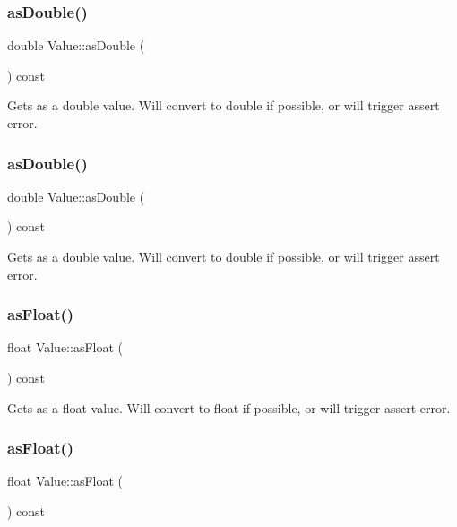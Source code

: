\subsubsection{\texorpdfstring{as\+Double()}{asDouble()}\hspace{0.1cm}{\footnotesize\ttfamily [1/2]}}
{\footnotesize\ttfamily double Value\+::as\+Double (\begin{DoxyParamCaption}{ }\end{DoxyParamCaption}) const}

Gets as a double value. Will convert to double if possible, or will trigger assert error. \mbox{\label{classValue_abf6f3457cc800530c5a60bf2990ab6a7}} 
\subsubsection{\texorpdfstring{as\+Double()}{asDouble()}\hspace{0.1cm}{\footnotesize\ttfamily [2/2]}}
{\footnotesize\ttfamily double Value\+::as\+Double (\begin{DoxyParamCaption}{ }\end{DoxyParamCaption}) const}

Gets as a double value. Will convert to double if possible, or will trigger assert error. \mbox{\label{classValue_a5caa49c1bfacb7bd667e1fc0725cd737}} 
\subsubsection{\texorpdfstring{as\+Float()}{asFloat()}\hspace{0.1cm}{\footnotesize\ttfamily [1/2]}}
{\footnotesize\ttfamily float Value\+::as\+Float (\begin{DoxyParamCaption}{ }\end{DoxyParamCaption}) const}

Gets as a float value. Will convert to float if possible, or will trigger assert error. \mbox{\label{classValue_a5caa49c1bfacb7bd667e1fc0725cd737}} 
\subsubsection{\texorpdfstring{as\+Float()}{asFloat()}\hspace{0.1cm}{\footnotesize\ttfamily [2/2]}}
{\footnotesize\ttfamily float Value\+::as\+Float (\begin{DoxyParamCaption}{ }\end{DoxyParamCaption}) const}


